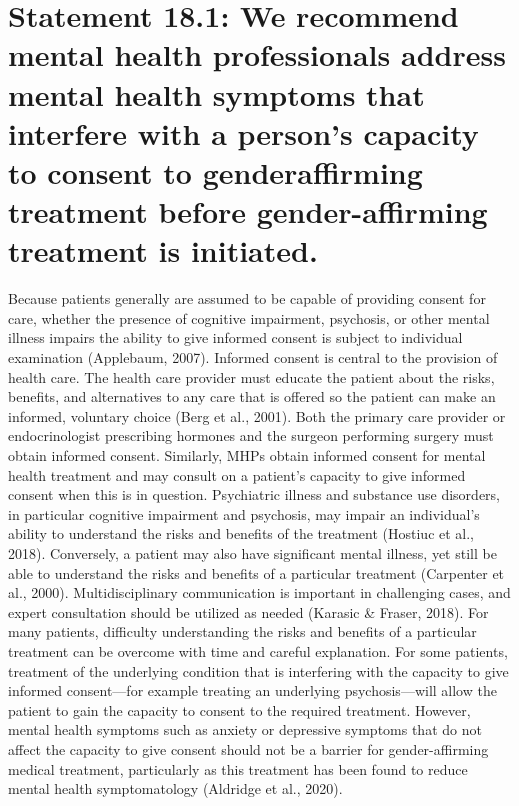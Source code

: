 \documentclass[
]{book}
\begin{document}
\hypertarget{statement-18.1-we-recommend-mental-health-professionals-address-mental-health-symptoms-that-interfere-with-a-persons-capacity-to-consent-to-genderaffirming-treatment-before-gender-affirming-treatment-is-initiated.}{%
\section*{Statement 18.1: We recommend mental health professionals address mental health symptoms that interfere with a person's capacity to consent to genderaffirming treatment before gender-affirming treatment is initiated.}\label{statement-18.1-we-recommend-mental-health-professionals-address-mental-health-symptoms-that-interfere-with-a-persons-capacity-to-consent-to-genderaffirming-treatment-before-gender-affirming-treatment-is-initiated.}}

Because patients generally are assumed to be
capable of providing consent for care, whether
the presence of cognitive impairment, psychosis,
or other mental illness impairs the ability to give
informed consent is subject to individual examination (Applebaum, 2007). Informed consent is
central to the provision of health care. The health
care provider must educate the patient about the
risks, benefits, and alternatives to any care that
is offered so the patient can make an informed,
voluntary choice (Berg et al., 2001). Both the
primary care provider or endocrinologist prescribing hormones and the surgeon performing
surgery must obtain informed consent. Similarly,
MHPs obtain informed consent for mental health
treatment and may consult on a patient's capacity
to give informed consent when this is in question. Psychiatric illness and substance use disorders, in particular cognitive impairment and
psychosis, may impair an individual's ability to
understand the risks and benefits of the treatment
(Hostiuc et al., 2018). Conversely, a patient may
also have significant mental illness, yet still be
able to understand the risks and benefits of a
particular treatment (Carpenter et al., 2000).
Multidisciplinary communication is important in
challenging cases, and expert consultation should
be utilized as needed (Karasic \& Fraser, 2018).
For many patients, difficulty understanding the
risks and benefits of a particular treatment can
be overcome with time and careful explanation.
For some patients, treatment of the underlying
condition that is interfering with the capacity to
give informed consent---for example treating an
underlying psychosis---will allow the patient to
gain the capacity to consent to the required treatment. However, mental health symptoms such as
anxiety or depressive symptoms that do not affect
the capacity to give consent should not be a barrier for gender-affirming medical treatment, particularly as this treatment has been found to
reduce mental health symptomatology (Aldridge
et al., 2020).
\end{document}
